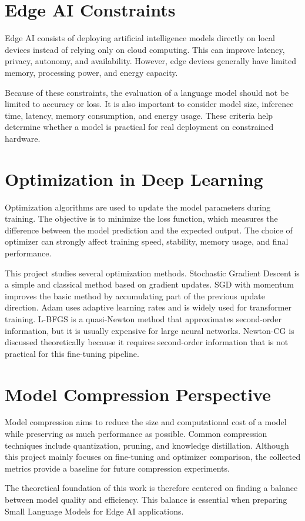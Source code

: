 \section{Edge AI Constraints}

Edge AI consists of deploying artificial intelligence models directly on local
devices instead of relying only on cloud computing. This can improve latency,
privacy, autonomy, and availability. However, edge devices generally have limited
memory, processing power, and energy capacity.

\vspace*{0.15cm}

Because of these constraints, the evaluation of a language model should not be
limited to accuracy or loss. It is also important to consider model size,
inference time, latency, memory consumption, and energy usage. These criteria help
determine whether a model is practical for real deployment on constrained
hardware.

\section{Optimization in Deep Learning}

Optimization algorithms are used to update the model parameters during training.
The objective is to minimize the loss function, which measures the difference
between the model prediction and the expected output. The choice of optimizer can
strongly affect training speed, stability, memory usage, and final performance.

\vspace*{0.15cm}

This project studies several optimization methods. Stochastic Gradient Descent is
a simple and classical method based on gradient updates. SGD with momentum
improves the basic method by accumulating part of the previous update direction.
Adam uses adaptive learning rates and is widely used for transformer training.
L-BFGS is a quasi-Newton method that approximates second-order information, but it
is usually expensive for large neural networks. Newton-CG is discussed
theoretically because it requires second-order information that is not practical
for this fine-tuning pipeline.

\section{Model Compression Perspective}

Model compression aims to reduce the size and computational cost of a model while
preserving as much performance as possible. Common compression techniques include
quantization, pruning, and knowledge distillation. Although this project mainly
focuses on fine-tuning and optimizer comparison, the collected metrics provide a
baseline for future compression experiments.

\vspace*{0.15cm}

The theoretical foundation of this work is therefore centered on finding a balance
between model quality and efficiency. This balance is essential when preparing
Small Language Models for Edge AI applications.
